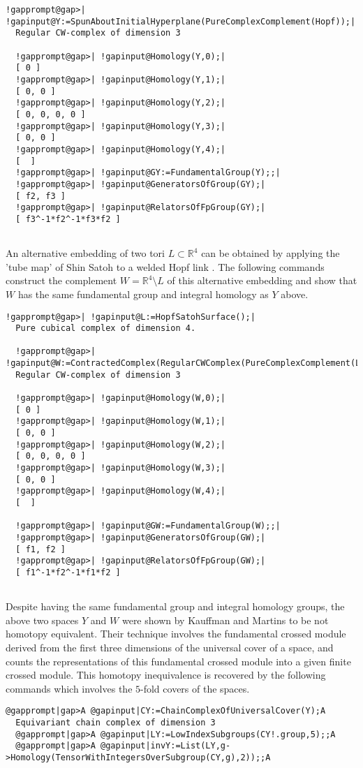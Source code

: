 \documentclass[a4paper,11pt]{report}
\begin{document}
{{\begin{Verbatim}[commandchars=!@|,fontsize=\small,frame=single,label=Example]
  !gapprompt@gap>| !gapinput@Y:=SpunAboutInitialHyperplane(PureComplexComplement(Hopf));|
  Regular CW-complex of dimension 3
  
  !gapprompt@gap>| !gapinput@Homology(Y,0);|
  [ 0 ]
  !gapprompt@gap>| !gapinput@Homology(Y,1);|
  [ 0, 0 ]
  !gapprompt@gap>| !gapinput@Homology(Y,2);|
  [ 0, 0, 0, 0 ]
  !gapprompt@gap>| !gapinput@Homology(Y,3);|
  [ 0, 0 ]
  !gapprompt@gap>| !gapinput@Homology(Y,4);|
  [  ]
  !gapprompt@gap>| !gapinput@GY:=FundamentalGroup(Y);;|
  !gapprompt@gap>| !gapinput@GeneratorsOfGroup(GY);|
  [ f2, f3 ]
  !gapprompt@gap>| !gapinput@RelatorsOfFpGroup(GY);|
  [ f3^-1*f2^-1*f3*f2 ]
  
\end{Verbatim}
 

An alternative embedding of two tori $L\subset \mathbb R^4 $ can be obtained by applying the 'tube map' of Shin Satoh to a welded Hopf link \cite{MR1758871}. The following commands construct the complement $W=\mathbb R^4\setminus L$ of this alternative embedding and show that $W $ has the same fundamental group and integral homology as $Y$ above. 
\begin{Verbatim}[commandchars=!@|,fontsize=\small,frame=single,label=Example]
  !gapprompt@gap>| !gapinput@L:=HopfSatohSurface();|
  Pure cubical complex of dimension 4.
  
  !gapprompt@gap>| !gapinput@W:=ContractedComplex(RegularCWComplex(PureComplexComplement(L)));|
  Regular CW-complex of dimension 3
  
  !gapprompt@gap>| !gapinput@Homology(W,0);|
  [ 0 ]
  !gapprompt@gap>| !gapinput@Homology(W,1);|
  [ 0, 0 ]
  !gapprompt@gap>| !gapinput@Homology(W,2);|
  [ 0, 0, 0, 0 ]
  !gapprompt@gap>| !gapinput@Homology(W,3);|
  [ 0, 0 ]
  !gapprompt@gap>| !gapinput@Homology(W,4);|
  [  ]
  
  !gapprompt@gap>| !gapinput@GW:=FundamentalGroup(W);;|
  !gapprompt@gap>| !gapinput@GeneratorsOfGroup(GW);|
  [ f1, f2 ]
  !gapprompt@gap>| !gapinput@RelatorsOfFpGroup(GW);|
  [ f1^-1*f2^-1*f1*f2 ]
  
\end{Verbatim}
 

Despite having the same fundamental group and integral homology groups, the
above two spaces $Y$ and $W$ were shown by Kauffman and Martins \cite{MR2441256} to be not homotopy equivalent. Their technique involves the fundamental
crossed module derived from the first three dimensions of the universal cover
of a space, and counts the representations of this fundamental crossed module
into a given finite crossed module. This homotopy inequivalence is recovered
by the following commands which involves the $5$-fold covers of the spaces. 
\begin{Verbatim}[commandchars=@|A,fontsize=\small,frame=single,label=Example]
  @gapprompt|gap>A @gapinput|CY:=ChainComplexOfUniversalCover(Y);A
  Equivariant chain complex of dimension 3
  @gapprompt|gap>A @gapinput|LY:=LowIndexSubgroups(CY!.group,5);;A
  @gapprompt|gap>A @gapinput|invY:=List(LY,g->Homology(TensorWithIntegersOverSubgroup(CY,g),2));;A
  

\end{Verbatim}}}
\end{document}
